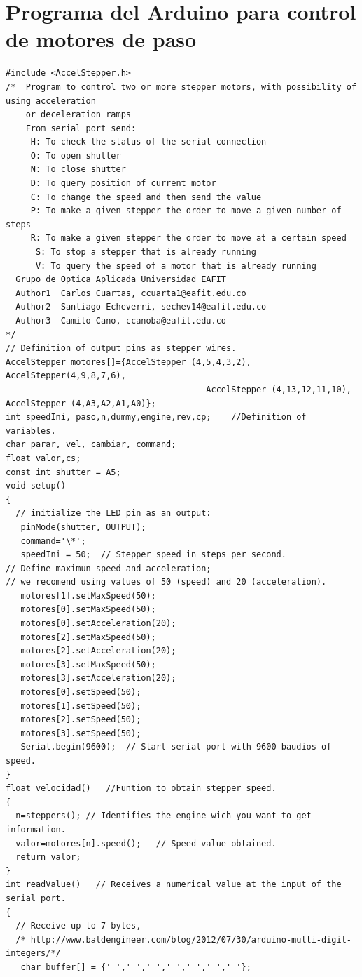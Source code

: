 \section{Programa del Arduino para control de motores de paso}
\begin{lstlisting}[style=Arduino]
#include <AccelStepper.h>
/*  Program to control two or more stepper motors, with possibility of using acceleration 
    or deceleration ramps
    From serial port send:
     H: To check the status of the serial connection
     O: To open shutter
     N: To close shutter
     D: To query position of current motor
     C: To change the speed and then send the value 
     P: To make a given stepper the order to move a given number of steps
     R: To make a given stepper the order to move at a certain speed
      S: To stop a stepper that is already running
      V: To query the speed of a motor that is already running
  Grupo de Optica Aplicada Universidad EAFIT
  Author1  Carlos Cuartas, ccuarta1@eafit.edu.co
  Author2  Santiago Echeverri, sechev14@eafit.edu.co
  Author3  Camilo Cano, ccanoba@eafit.edu.co
*/
// Definition of output pins as stepper wires.
AccelStepper motores[]={AccelStepper (4,5,4,3,2), AccelStepper(4,9,8,7,6), 
                                        AccelStepper (4,13,12,11,10), AccelStepper (4,A3,A2,A1,A0)};
int speedIni, paso,n,dummy,engine,rev,cp;    //Definition of variables.
char parar, vel, cambiar, command;
float valor,cs;
const int shutter = A5;
void setup()
{  
  // initialize the LED pin as an output:
   pinMode(shutter, OUTPUT);   
   command='\*'; 
   speedIni = 50;  // Stepper speed in steps per second. 
// Define maximun speed and acceleration;
// we recomend using values of 50 (speed) and 20 (acceleration).
   motores[1].setMaxSpeed(50);   
   motores[0].setMaxSpeed(50);
   motores[0].setAcceleration(20);
   motores[2].setMaxSpeed(50);
   motores[2].setAcceleration(20);
   motores[3].setMaxSpeed(50);
   motores[3].setAcceleration(20);
   motores[0].setSpeed(50);
   motores[1].setSpeed(50);
   motores[2].setSpeed(50);
   motores[3].setSpeed(50);
   Serial.begin(9600);	// Start serial port with 9600 baudios of speed.
}
float velocidad()   //Funtion to obtain stepper speed.
{
  n=steppers(); // Identifies the engine wich you want to get information.
  valor=motores[n].speed();   // Speed value obtained.
  return valor;
}
int readValue()   // Receives a numerical value at the input of the serial port.
{
  // Receive up to 7 bytes,
  /* http://www.baldengineer.com/blog/2012/07/30/arduino-multi-digit-integers/*/
   char buffer[] = {' ',' ',' ',' ',' ',' ',' '}; 

\end{lstlisting}

